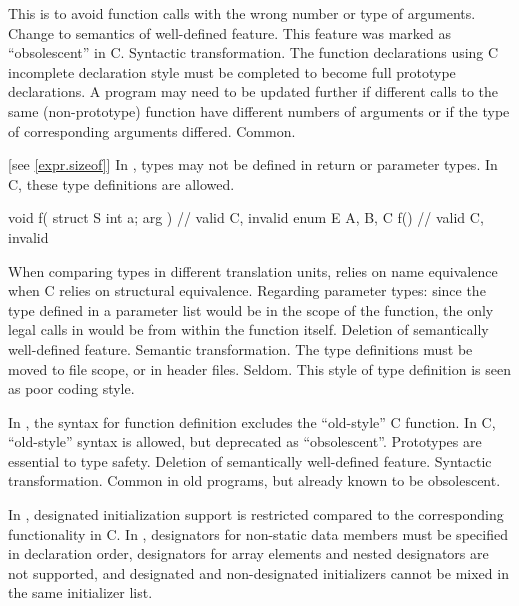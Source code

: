 \rationale
This is to avoid function calls
with the wrong number or type of arguments.
\effect
Change to semantics of well-defined feature.
This feature was marked as ``obsolescent'' in C.
\difficulty
Syntactic transformation.
The function declarations using C incomplete declaration style must
be completed to become full prototype declarations.
A program may need to be updated further if different calls to the
same (non-prototype) function have different numbers of arguments or
if the type of corresponding arguments differed.
\howwide
Common.

 [see \ref{expr.sizeof}]
\change
In \Cpp{}, types may not be defined in return or parameter types.
In C, these type definitions are allowed.

\begin{example}
\begin{codeblock}
void f( struct S { int a; } arg ) {}    // valid C, invalid \Cpp{}
enum E { A, B, C } f() {}               // valid C, invalid \Cpp{}
\end{codeblock}
\end{example}

\rationale
When comparing types in different translation units, \Cpp{} relies
on name equivalence when C relies on structural equivalence.
Regarding parameter types: since the type defined in a parameter list
would be in the scope of the function, the only legal calls in \Cpp{}
would be from within the function itself.
\effect
Deletion of semantically well-defined feature.
\difficulty
Semantic transformation.
The type definitions must be moved to file scope, or in header files.
\howwide
Seldom.
This style of type definition is seen as poor coding style.

\change
In \Cpp{}, the syntax for function definition excludes the ``old-style'' C function.
In C, ``old-style'' syntax is allowed, but deprecated as ``obsolescent''.
\rationale
Prototypes are essential to type safety.
\effect
Deletion of semantically well-defined feature.
\difficulty
Syntactic transformation.
\howwide
Common in old programs, but already known to be obsolescent.

\change
In \Cpp{}, designated initialization support is restricted
compared to the corresponding functionality in C\@.
In \Cpp{},
designators for non-static data members
must be specified in declaration order,
designators for array elements and nested designators
are not supported,
and
designated and non-designated initializers
cannot be mixed in the same initializer list.

